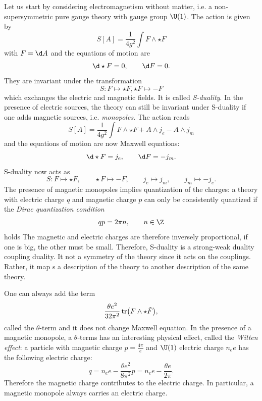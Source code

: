 \documentclass{worksheetclass}
\begin{document}
    Let us start by considering electromagnetism without matter, i.e. a non-supersymmetric pure gauge theory with gauge group $\U(1)$. The action is given by
    \begin{equation}
        S[A]=\frac{1}{4g^2}\int F\wedge\star F
    \end{equation}
    with $F=\d A$ and the equations of motion are
    \begin{equation}
        \d\star F=0,\qquad \d F=0.
    \end{equation}
    They are invariant under the transformation
    \begin{equation}
        S:F\mapsto\star F,\star F\mapsto-F
    \end{equation}
    which exchanges the electric and magnetic fields. It is called \emph{S-duality}. In the presence of electric sources, the theory can still be invariant under S-duality if one adds magnetic sources, i.e. \emph{monopoles}. The action reads
    \begin{equation}
        S[A]=\frac{1}{4g^2}\int F\wedge\star F+A\wedge j_e-A\wedge j_m
    \end{equation}
    and the equations of motion are now Maxwell equations:
    \begin{equation}
        \d\star F=j_e,\qquad \d F=-j_m.
    \end{equation}
    S-duality now acts as
    \begin{equation}
        S:F\mapsto\star F,\qquad \star F\mapsto-F,\qquad j_e\mapsto j_m,\qquad j_m\mapsto-j_e.
    \end{equation}
    The presence of magnetic monopoles implies quantization of the charges: a theory with electric charge $q$ and magnetic charge $p$ can only be consistently quantized if the \emph{Dirac quantization condition}
    \begin{equation}
        qp=2\pi n,\qquad n\in\Z
    \end{equation}
    holds The magnetic and electric charges are therefore inversely proportional, if one is big, the other must be small. Therefore, S-duality is a strong-weak duality coupling duality. It not a symmetry of the theory since it acts on the couplings. Rather, it map s a description of the theory to another description of the same theory.

    One can always add the term
    \begin{equation}
        \frac{\theta e^2}{32\pi^2}\tr(F\wedge\star\tilde{F}),
    \end{equation}
    called the $\theta$-term and it does not change Maxwell equation. In the presence of a magnetic monopole, a $\theta$-terms has an interesting physical effect, called the \emph{Witten effect}: a particle with magnetic charge $p=\frac{4\pi}{e}$ and $\U(1)$ electric charge $n_ee$ has the following electric charge:
    \begin{equation}
        q = n_ee-\frac{\theta e^2}{8\pi^2}p=n_ee-\frac{\theta e}{2\pi}.
    \end{equation}
    Therefore the magnetic charge contributes to the electric charge. In particular, a magnetic monopole always carries an electric charge.
\end{document}

